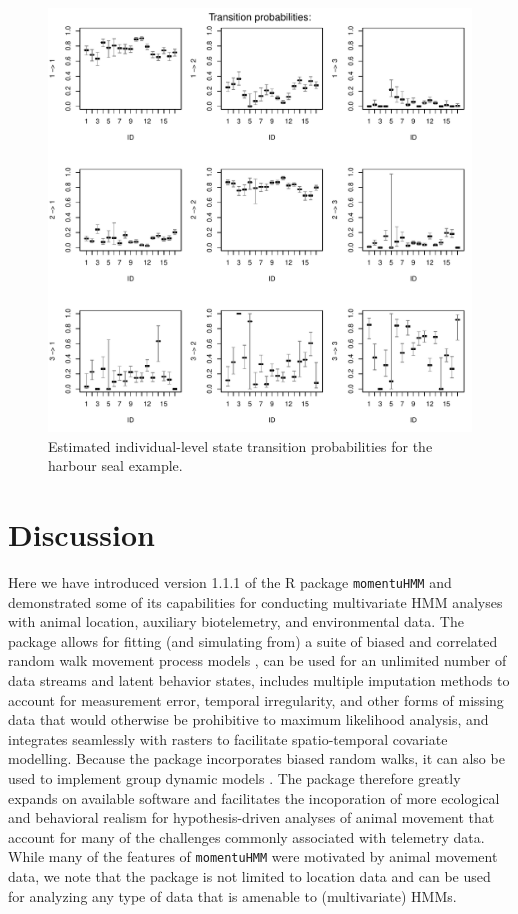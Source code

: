 \documentclass[12pt]{article}\usepackage[]{graphicx}\usepackage[]{color}
\begin{document}
\begin{figure}[htbp]
  \centering
  \includegraphics[width=\textwidth]{plot_harbourSealResults021}
  \caption{Estimated individual-level state transition probabilities for the harbour seal example.}
  \label{fig:hsTPM}
\end{figure}

\section{Discussion}
Here we have introduced version 1.1.1 of the R package \verb|momentuHMM| and demonstrated some of its capabilities for conducting multivariate HMM analyses with animal location, auxiliary biotelemetry, and environmental data. The package allows for fitting (and simulating from) a suite of biased and correlated random walk movement process models \citep[e.g.][]{McClintockEtAl2012}, can be used for an unlimited number of data streams and latent behavior states, includes multiple imputation methods to account for measurement error, temporal irregularity, and other forms of missing data that would otherwise be prohibitive to maximum likelihood analysis, and integrates seamlessly with rasters to facilitate spatio-temporal covariate modelling. Because the package incorporates biased random walks, it can also be used to implement group dynamic models \cite[e.g.][]{LangrockEtAl2014}. The package therefore greatly expands on available software and facilitates the incoporation of more ecological and behavioral realism for hypothesis-driven analyses of animal movement that account for many of the challenges commonly associated with telemetry data. While many of the features of \verb|momentuHMM| were motivated by animal movement data, we note that the package is not limited to location data and can be used for analyzing any type of data that is amenable to (multivariate) HMMs.
\end{document}
